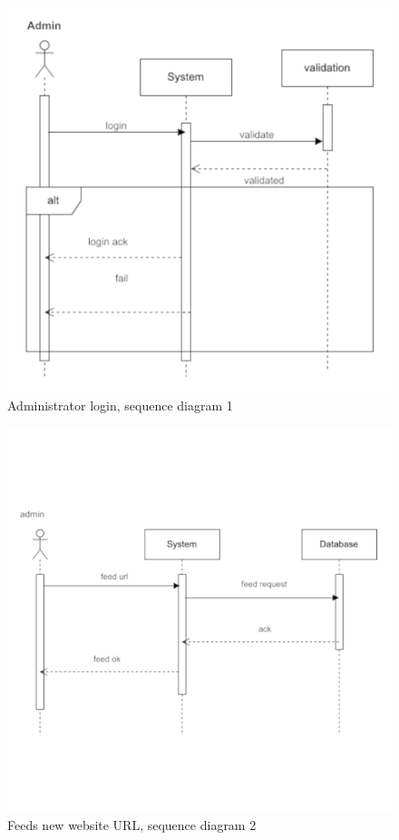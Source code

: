 \documentclass{scrartcl}
\begin{document}
\begin{figure}[H]
  \begin{center}
    \caption{Administrator login, sequence diagram 1}
    \includegraphics[scale=0.63]{seq-diagram-1.png}
  \end{center}
\end{figure}

\begin{figure}[H]
  \begin{center}
    \caption{Feeds new website URL, sequence diagram 2}
    \includegraphics[scale=0.7]{seq-diagram-2.png}
  \end{center}
\end{figure}
\end{document}
